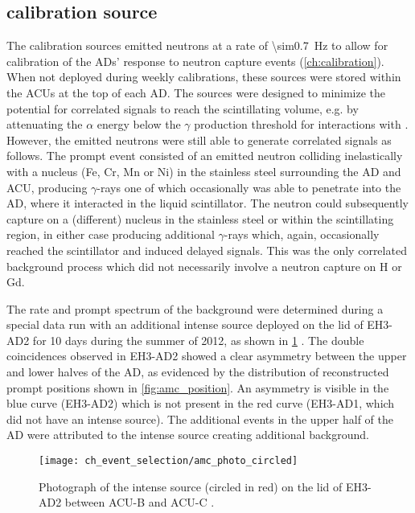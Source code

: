 \subsection{\texorpdfstring{\amcbold}{Am-C} calibration source}
\label{subsec:amc}

The \amc{} calibration sources emitted neutrons at a rate of \SI{\sim0.7}{\Hz}
to allow for calibration of the ADs' response to neutron capture events
(\cref{ch:calibration}).
When not deployed during weekly calibrations, these sources
were stored within the ACUs at the top of each AD.
The sources were designed to minimize
the potential for correlated signals to reach the scintillating volume,
e.g. by attenuating the $\alpha$ energy below the $\gamma$ production
threshold for interactions with  \cite{ngd2016}.
However, the emitted neutrons were still able to generate
correlated signals as follows.
The prompt event consisted of an emitted neutron colliding inelastically
with a nucleus (Fe, Cr, Mn or Ni) in the stainless steel surrounding the AD and ACU,
producing $\gamma$-rays one of which occasionally was able to penetrate
into the AD, where it interacted in the liquid scintillator.
The neutron could subsequently capture on a (different) nucleus
in the stainless steel or within the scintillating region,
in either case producing additional $\gamma$-rays
which, again, occasionally reached the scintillator and induced delayed signals.
This was the only correlated background process
which did not necessarily involve a neutron capture on H or Gd.

The rate and prompt spectrum of the \amc{} background were determined
during a special data run with an additional intense \amc{} source
deployed on the lid of EH3-AD2 for 10 days during the summer of 2012,
as shown in \cref{fig:amc_photo} \cite{nh2016technote}.
The double coincidences observed in EH3-AD2 showed a clear asymmetry
between the upper and lower halves of the AD,
as evidenced by the distribution of reconstructed prompt positions
shown in \cref{fig:amc_position}.
An asymmetry is visible in the blue curve (EH3-AD2)
which is not present in the red curve
(EH3-AD1, which did not have an intense \amc{} source).
The additional events in the upper half of the AD
were attributed to the intense \amc{} source creating additional background.

\begin{figure}
    \centering
    \texttt{[image: ch\_event\_selection/amc\_photo\_circled]}
    \caption[Intense \amc{} source photograph]{
        Photograph of the intense \amc{} source (circled in red)
        on the lid of EH3-AD2 between ACU-B and ACU-C \cite{amc_photo}.
    }
    \label{fig:amc_photo}
\end{figure}


